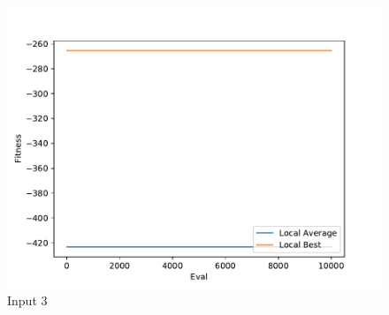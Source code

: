 \documentclass{standalone}
\begin{document}
\begin{figure}[!htb]
	\caption{Input 3}
	\label{fig:graph_3025}
	\includegraphics[width=\textwidth]{../graphs/graphs/3025.pdf}
\end{figure}
\end{document}

